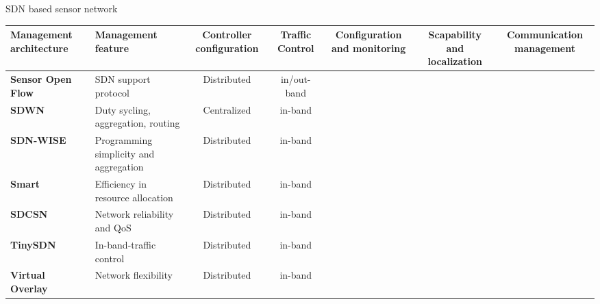 \begin{frame}{SDN based sensor network}{}
\begin{table}[h!]
\changefontsizes{5pt}
\begin{center}
	\begin{tabulary}{\columnwidth}{L|L|C|C|C|C|C}
	\textbf{Management architecture}                 & \textbf{Management feature}            & \textbf{Controller configuration} & \textbf{Traffic Control} & \textbf{Configuration and monitoring} & \textbf{Scapability and localization} & \textbf{Communication management}\\\hline
	\textbf{\cite{luo_sensor_2012} Sensor Open Flow} & SDN support protocol                   & Distributed                       & in/out-band              & \ok                                   & \ok                                   & \ok                              \\\hline
	\textbf{\cite{costanzo_software_} SDWN}          & Duty sycling, aggregation, routing     & Centralized                       & in-band                  & \ok                                   &                                       & \\\hline
	\textbf{\cite{galluccio_sdnwise_2015} SDN-WISE}  & Programming simplicity and aggregation & Distributed                       & in-band                  &                                       & \ok                                   & \\\hline
	\textbf{\cite{degante_smart_2014a} Smart}        & Efficiency in resource allocation      & Distributed                       & in-band                  &                                       & \ok                                   & \\\hline
	\textbf{SDCSN}                                   & Network reliability and QoS            & Distributed                       & in-band                  &                                       & \ok                                   & \\\hline
	\textbf{TinySDN}                                 & In-band-traffic control                & Distributed                       & in-band                  &                                       & \ok                                   & \\\hline
	\textbf{Virtual Overlay}                         & Network flexibility                    & Distributed                       & in-band                  &                                       & \ok                                   & \\\hline

\end{tabulary}
\end{center}
\end{table}
\end{frame}

